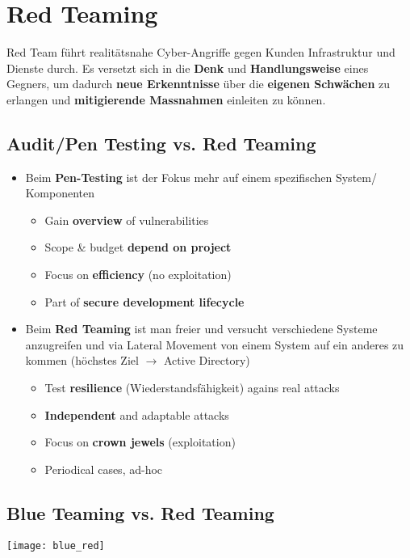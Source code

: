 

\section{Red Teaming}
Red Team führt realitätsnahe Cyber-Angriffe gegen Kunden Infrastruktur und Dienste durch. Es versetzt sich in die \textbf{Denk} und \textbf{Handlungsweise} eines Gegners, um dadurch \textbf{neue Erkenntnisse} über die \textbf{eigenen Schwächen} zu erlangen und \textbf{mitigierende Massnahmen} einleiten zu können.

\subsection{Audit/Pen Testing vs. Red Teaming}
\begin{itemize}
    \item Beim \textbf{Pen-Testing} ist der Fokus mehr auf einem spezifischen System/ Komponenten
    \begin{itemize}
        \item Gain \textbf{overview} of vulnerabilities
        \item Scope \& budget \textbf{depend on project}
        \item Focus on \textbf{efficiency} (no exploitation)
        \item Part of \textbf{secure development lifecycle}\\
    \end{itemize}
    \item Beim \textbf{Red Teaming} ist man freier und versucht verschiedene Systeme anzugreifen und via Lateral Movement von einem System auf ein anderes zu kommen (höchstes Ziel $\rightarrow$ Active Directory)
    \begin{itemize}
        \item Test \textbf{resilience} (Wiederstandsfähigkeit) agains real attacks
        \item \textbf{Independent} and adaptable attacks
        \item Focus on \textbf{crown jewels} (exploitation)
        \item Periodical cases, ad-hoc
    \end{itemize}
\end{itemize}

\subsection{Blue Teaming vs. Red Teaming}
\begin{center}
    \texttt{[image: blue\_red]}
    \vspace{-8pt}
\end{center}

